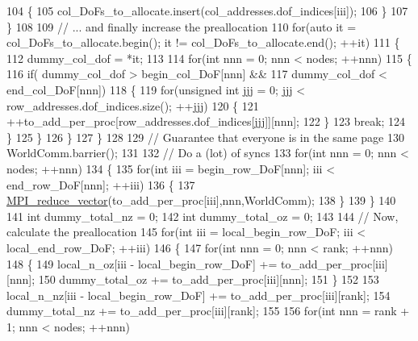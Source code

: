 \begin{DoxyCode}
104             \{
105                 col\_DoFs\_to\_allocate.insert(col\_addresses.dof\_indices[iii]);
106             \}
107         \}
108 
109         \textcolor{comment}{// ... and finally increase the preallocation}
110         \textcolor{keywordflow}{for}(\textcolor{keyword}{auto} it = col\_DoFs\_to\_allocate.begin(); it != col\_DoFs\_to\_allocate.end(); ++it)
111         \{
112             dummy\_col\_dof = *it;
113 
114             \textcolor{keywordflow}{for}(\textcolor{keywordtype}{int} nnn = 0; nnn < nodes; ++nnn)
115             \{
116                 \textcolor{keywordflow}{if}( dummy\_col\_dof > begin\_col\_DoF[nnn] &&
117                     dummy\_col\_dof < end\_col\_DoF[nnn])
118                 \{
119                     \textcolor{keywordflow}{for}(\textcolor{keywordtype}{unsigned} \textcolor{keywordtype}{int} jjj = 0; jjj < row\_addresses.dof\_indices.size(); ++jjj)
120                     \{
121                         ++to\_add\_per\_proc[row\_addresses.dof\_indices[jjj]][nnn];
122                     \}
123                     \textcolor{keywordflow}{break};
124                 \}
125             \}
126         \}
127     \}
128 
129     \textcolor{comment}{// Guarantee that everyone is in the same page}
130     WorldComm.barrier();
131 
132     \textcolor{comment}{// Do a (lot) of syncs}
133     \textcolor{keywordflow}{for}(\textcolor{keywordtype}{int} nnn = 0; nnn < nodes; ++nnn)
134     \{
135         \textcolor{keywordflow}{for}(\textcolor{keywordtype}{int} iii = begin\_row\_DoF[nnn]; iii < end\_row\_DoF[nnn]; ++iii)
136         \{
137             \hyperlink{namespacecarl_a461e9a455e02d991c920b4b56390f326}{MPI\_reduce\_vector}(to\_add\_per\_proc[iii],nnn,WorldComm);
138         \}
139     \}
140 
141     \textcolor{keywordtype}{int} dummy\_total\_nz = 0;
142     \textcolor{keywordtype}{int} dummy\_total\_oz = 0;
143 
144     \textcolor{comment}{// Now, calculate the preallocation}
145     \textcolor{keywordflow}{for}(\textcolor{keywordtype}{int} iii = local\_begin\_row\_DoF; iii < local\_end\_row\_DoF; ++iii)
146     \{
147         \textcolor{keywordflow}{for}(\textcolor{keywordtype}{int} nnn = 0; nnn < rank; ++nnn)
148         \{
149             local\_n\_oz[iii - local\_begin\_row\_DoF] += to\_add\_per\_proc[iii][nnn];
150             dummy\_total\_oz += to\_add\_per\_proc[iii][nnn];
151         \}
152 
153         local\_n\_nz[iii - local\_begin\_row\_DoF] += to\_add\_per\_proc[iii][rank];
154         dummy\_total\_nz += to\_add\_per\_proc[iii][rank];
155 
156         \textcolor{keywordflow}{for}(\textcolor{keywordtype}{int} nnn = rank + 1; nnn < nodes; ++nnn)

\end{DoxyCode}
